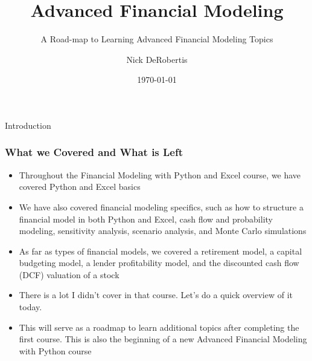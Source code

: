 \documentclass[handout, 11pt]{beamer}
\institute[UF]{\inst{1}
University of Florida\\
Department of Finance, Insurance, and Real Estate}
\begin{document}
\title[Modeling Road-map]{Advanced Financial Modeling}
\subtitle{A Road-map to Learning Advanced Financial Modeling Topics}
\author[DeRobertis]{Nick DeRobertis}
\date{\today}
\begin{frame}
\titlepage
\label{title-frame}
\end{frame}
\begin{section}{Introduction}
\begin{frame}
\frametitle{What we Covered and What is Left}
\begin{itemize}
\small
\vfill
\item Throughout the Financial Modeling with Python and Excel course, we have covered Python and Excel basics
\vfill
\item We have also covered financial modeling specifics, such as how to structure a financial model in both Python and Excel, cash flow and probability modeling, sensitivity analysis, scenario analysis, and Monte Carlo simulations
\vfill
\item As far as types of financial models, we covered a retirement model, a capital budgeting model, a lender profitability model, and the discounted cash flow (DCF) valuation of a stock
\vfill
\item There is a lot I didn't cover in that course. Let's do a quick overview of it today.
\vfill
\item This will serve as a roadmap to learn additional topics after completing the first course. This is also the beginning of a new Advanced Financial Modeling with Python course
\end{itemize}
\end{frame}
\end{section}
\end{document}
